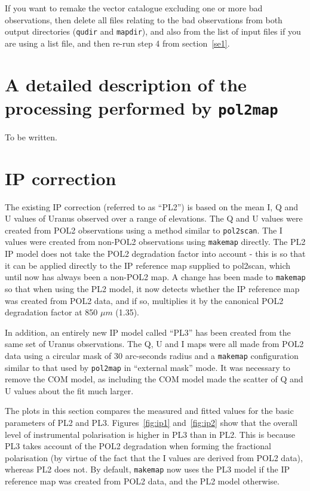 \documentclass[twoside,11pt]{starlink}
\begin{document}
If you want to remake the vector catalogue excluding one or more bad
observations, then delete all files relating to the bad observations from
both output directories (\texttt{qudir} and \texttt{mapdir}), and also
from the list of input files if you are using a list file, and then
re-run step 4 from section~\ref{se1}.

\section{A detailed description of the processing performed by \texttt{pol2map}}
To be written.

\section{IP correction}
The existing IP correction (referred to as ``PL2'') is based on the mean I, Q
and U values of Uranus observed over a range of elevations. The Q and U
values were created from POL2 observations using a method similar to
\texttt{pol2scan}. The I values were created from non-POL2 observations
using \texttt{makemap} directly. The PL2 IP model does not take the POL2
degradation factor into account - this is so that it can be applied
directly to the IP reference map supplied to pol2scan, which until now
has always been a non-POL2 map. A change has been made to
\texttt{makemap} so that when using the PL2 model, it now detects whether
the IP reference map was created from POL2 data, and if so, multiplies it
by the canonical POL2 degradation factor at 850 $\mu m$ (1.35).

In addition, an entirely new IP model called ``PL3'' has been created
from the same set of Uranus observations. The Q, U and I maps were all
made from POL2 data using a circular mask of 30 arc-seconds radius and a
\texttt{makemap} configuration similar to that used by \texttt{pol2map}
in ``external mask'' mode. It was necessary to remove the COM model, as
including the COM model made the scatter of Q and U values about the fit
much larger.

The plots in this section compares the measured and fitted values for the
basic parameters of PL2 and PL3. Figures~\ref{fig:ip1} and~\ref{fig:ip2}
show that the overall level of instrumental polarisation is higher in PL3
than in PL2. This is because PL3 takes account of the POL2 degradation
when forming the fractional polarisation (by virtue of the fact that the
I values are derived from POL2 data), whereas PL2 does not. By default,
\texttt{makemap} now uses the PL3 model if the IP reference map was
created from POL2 data, and the PL2 model otherwise.
\end{document}
